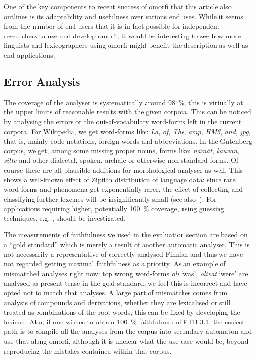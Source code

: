 \documentclass[a4paper,12pt]{article}
\begin{document}
One of the key components to recent success of omorfi that this article also
outlines is its adaptability and usefulness over various end uses.  While it
seems from the number of end users that it is in fact possible for
independent researchers to use and develop omorfi, it would be interesting
to see how more linguists and lexicographers using omorfi might benefit the
description as well as end applications.

\subsection{Error Analysis}

The coverage of the analyser is systematically around 98~\%, this is
virtually at the upper limits of reasonable results with the given corpora.
This can be noticed by analysing the errors or the out-of-vocabulary
word-forms left in the current corpora. For Wikipedia, we get word-forms
like: \textit{Lä}, \textit{of}, \textit{The}, \textit{amp}, \textit{HMS},
\textit{and}, \textit{jpg}, that is, mainly code notations, foreign words
and abbreviations. In the Gutenberg corpus, we get, among some missing
proper nouns, forms like: \textit{nämät}, \textit{kauvan}, \textit{sitte}
and other dialectal, spoken, archaic or otherwise non-standard forms. Of
course these are all plausible additions for morphological analyser as well.
This shows a well-known effect of Zipfian distribution of language data:
since rare word-forms and phenomena get exponentially rarer, the effect of
collecting and classifying further lexemes will be insignificantly small
(see also~\cite{manning?}). For applications requiring higher, potentially
100~\% coverage, using guessing techniques, e.g. \citet{}, should be
investigated.

The measurements of faithfulness we used in the evaluation section are based on
a ``gold standard'' which is merely a result of another automatic analyser.
This is not necessarily a representative of correctly analysed Finnish and thus
we have not regarded getting maximal faithfulness as a priority. As an example
of mismatched analyses right now: top wrong word-forms \textit{oli} `was',
\textit{olivat} `were' are analysed as present tense in the gold standard, we
feel this is incorrect and have opted not to match that analyses. A large part
of mismatches comes from analysis of compounds and derivations, whether they
are lexicalised or still treated as combinations of the root words, this can be
fixed by developing the lexicon.  Also, if one wishes to obtain 100~\%
faithfulness of FTB 3.1, the easiest path is to compile all the analyses from
the corpus into secondary automaton and use that along omorfi, although it is
unclear what the use case would be, beyond reproducing the mistakes contained
within that corpus.
\end{document}
